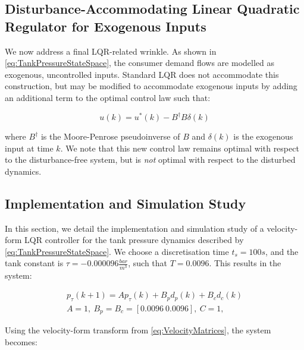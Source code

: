 \subsection{Disturbance-Accommodating Linear Quadratic Regulator for Exogenous Inputs}\label{subsec:DALQR}

We now address a final LQR-related wrinkle. As shown in \cref{eq:TankPressureStateSpace}, the consumer demand flows are modelled as exogenous, uncontrolled inputs. Standard LQR does not accommodate this construction, but may be modified to accommodate exogenous inputs by adding an additional term to the optimal control law \cite{Singh2017} such that:


\begin{equation}\label{eq:ELQRControlLaw}
	u(k) = u^*(k) - B^\dagger B \delta(k)
\end{equation}

where $B^\dagger$ is the Moore-Penrose pseudoinverse of $B$ and $\delta(k)$ is the exogenous input at time $k$. We note that this new control law remains optimal with respect to the disturbance-free system, but is \textit{not} optimal with respect to the disturbed dynamics.

\subsection{Implementation and Simulation Study}\label{subsec:LQRSimulationStudy}

In this section, we detail the implementation and simulation study of a velocity-form LQR controller for the tank pressure dynamics described by \cref{eq:TankPressureStateSpace}. We choose a discretisation time $t_s = 100 \si{s}$, and the tank constant is $\tau = -0.000096 \frac{\si{bar}}{\si{m^3}}$, such that $T = 0.0096$. This results in the system:

\begin{equation}\label{eq:TankPressureMatrices}
	\begin{gathered}
		p_\tau(k+1) = A p_\tau(k) + B_p d_p(k) + B_c d_c(k)  \\
		A = 1, \ B_p = B_c = [0.0096 \ 0.0096], \ C = 1 ,
	\end{gathered}
\end{equation}

Using the velocity-form transform from \cref{eq:VelocityMatrices}, the system becomes:

